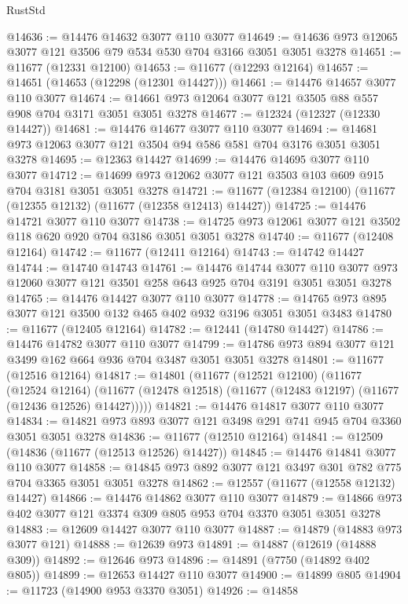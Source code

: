 \begin{lexlean}{RustStd}
\begin{coremodule}
@14636 := @14476 @14632 @3077 @110 @3077
@14649 := @14636 @973 @12065 @3077 @121 @3506 @79 @534 @530 @704 @3166 @3051 @3051 @3278
@14651 := @11677 (@12331 @12100)
@14653 := @11677 (@12293 @12164)
@14657 := @14651 (@14653 (@12298 (@12301 @14427)))
@14661 := @14476 @14657 @3077 @110 @3077
@14674 := @14661 @973 @12064 @3077 @121 @3505 @88 @557 @908 @704 @3171 @3051 @3051 @3278
@14677 := @12324 (@12327 (@12330 @14427))
@14681 := @14476 @14677 @3077 @110 @3077
@14694 := @14681 @973 @12063 @3077 @121 @3504 @94 @586 @581 @704 @3176 @3051 @3051 @3278
@14695 := @12363 @14427
@14699 := @14476 @14695 @3077 @110 @3077
@14712 := @14699 @973 @12062 @3077 @121 @3503 @103 @609 @915 @704 @3181 @3051 @3051 @3278
@14721 := @11677 (@12384 @12100) (@11677 (@12355 @12132) (@11677 (@12358 @12413) @14427))
@14725 := @14476 @14721 @3077 @110 @3077
@14738 := @14725 @973 @12061 @3077 @121 @3502 @118 @620 @920 @704 @3186 @3051 @3051 @3278
@14740 := @11677 (@12408 @12164)
@14742 := @11677 (@12411 @12164)
@14743 := @14742 @14427
@14744 := @14740 @14743
@14761 := @14476
    @14744
    @3077
    @110
    @3077
    @973
    @12060
    @3077
    @121
    @3501
    @258
    @643
    @925
    @704
    @3191
    @3051
    @3051
    @3278
@14765 := @14476 @14427 @3077 @110 @3077
@14778 := @14765 @973 @895 @3077 @121 @3500 @132 @465 @402 @932 @3196 @3051 @3051 @3483
@14780 := @11677 (@12405 @12164)
@14782 := @12441 (@14780 @14427)
@14786 := @14476 @14782 @3077 @110 @3077
@14799 := @14786 @973 @894 @3077 @121 @3499 @162 @664 @936 @704 @3487 @3051 @3051 @3278
@14801 := @11677 (@12516 @12164)
@14817 := @14801
    (@11677
      (@12521 @12100)
      (@11677
        (@12524 @12164)
        (@11677 (@12478 @12518) (@11677 (@12483 @12197) (@11677 (@12436 @12526) @14427)))))
@14821 := @14476 @14817 @3077 @110 @3077
@14834 := @14821 @973 @893 @3077 @121 @3498 @291 @741 @945 @704 @3360 @3051 @3051 @3278
@14836 := @11677 (@12510 @12164)
@14841 := @12509 (@14836 (@11677 (@12513 @12526) @14427))
@14845 := @14476 @14841 @3077 @110 @3077
@14858 := @14845 @973 @892 @3077 @121 @3497 @301 @782 @775 @704 @3365 @3051 @3051 @3278
@14862 := @12557 (@11677 (@12558 @12132) @14427)
@14866 := @14476 @14862 @3077 @110 @3077
@14879 := @14866 @973 @402 @3077 @121 @3374 @309 @805 @953 @704 @3370 @3051 @3051 @3278
@14883 := @12609 @14427 @3077 @110 @3077
@14887 := @14879 (@14883 @973 @3077 @121)
@14888 := @12639 @973
@14891 := @14887 (@12619 (@14888 @309))
@14892 := @12646 @973
@14896 := @14891 (@7750 (@14892 @402 @805))
@14899 := @12653 @14427 @110 @3077
@14900 := @14899 @805
@14904 := @11723 (@14900 @953 @3370 @3051)
@14926 := @14858

\end{coremodule}
\end{lexlean}

